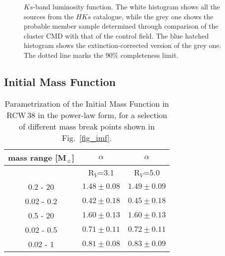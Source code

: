 \documentclass[a4paper,fleqn,usenatbib]{mnras}
\begin{document}
\begin{figure}
\centering
{}
\caption{$Ks$-band luminosity function. The white histogram shows all the sources from the $HKs$ catalogue, while
the grey one shows the probable member sample determined through comparison of the cluster CMD with that of the control field. 
The blue hatched histogram shows the extinction-corrected version of the grey one. The dotted line marks the 90$\%$ completeness limit.
}
\label{fig_klf}
\end{figure}



\subsection{Initial Mass Function}
\label{sec:imf}

\begin{figure*}
\centering
{}
\caption{Initial mass function of the central core of RCW\,38, represented in the equal-size bins of 0.2 dex in mass. We plot the points (black) and the 
corresponding fits from $10^4$ realizations of the performed Monte Carlo simulation (light blue and orange shaded area). 
The dark blue/orange lines show the final IMF, with the slopes calculated as a weighted average of the slopes obtained in the simulation.
The IMF is represented as a two-segment power-law,
with different break masses shown in the three panels. The blue diamonds mark the median value of all the realizations without correcting for the completeness,
for the bins where it has effect. The grey dashed line is the Kroupa segmented power-law mass function normalized at 0.5\,M$_{\sun}$.
}
\label{fig_imf}
\end{figure*}


\begin{table}
\centering
\caption{Parametrization of the Initial Mass Function in RCW\,38 in the power-law form, for a selection of different 
mass break points shown in Fig.~\ref{fig_imf}.}
\label{tab:imf}
\begin{tabular}{ccc}
mass range [M$_{\sun}$] & $\alpha$  & $\alpha$  \\
\hline
						& R$_V$=3.1 & R$_V$=5.0 \\	
\hline
\hline
		0.2 - 20 		& $1.48 \pm 0.08$  & $1.49 \pm 0.09$  \\
		0.02 - 0.2	 	& $0.42 \pm 0.18$ & $0.45 \pm 0.18$ \\	
\hline
		0.5 - 20 	 	& $1.60 \pm 0.13$ & $1.60 \pm 0.13$ \\
        0.02 - 0.5 		& $0.71 \pm 0.11$& $0.72 \pm 0.11$ \\	  
\hline
		0.02 - 1		& $0.81 \pm 0.08$ & $0.83 \pm 0.09$ \\ 
\hline 
\end{tabular}
\end{table}
\end{document}
